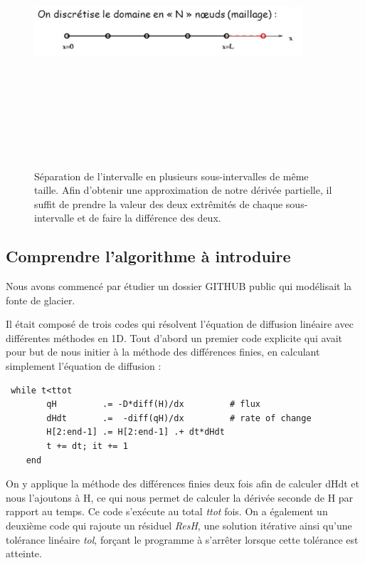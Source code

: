 \documentclass{article}
\begin{document}
\begin{figure}[!htpb]
\centering
\includegraphics[width=10cm, keepaspectratio=true, height=10cm]{Differences.png}
\caption{Séparation de l'intervalle en plusieurs sous-intervalles de même taille. Afin d'obtenir une approximation de notre dérivée partielle, il suffit de prendre la valeur des deux extrêmités de chaque sous-intervalle et de faire la différence des deux.}
\label{differences}
\end{figure}

\subsection{Comprendre l'algorithme à introduire}
Nous avons commencé par étudier un dossier GITHUB public \cite{site2} qui modélisait la fonte de glacier.
\newline

 Il était composé de trois codes qui résolvent l'équation de diffusion linéaire avec différentes méthodes en 1D. 
\newline
Tout d'abord un premier code explicite qui avait pour but de nous initier à la méthode des différences finies, en calculant simplement l'équation de diffusion : 

\begin{verbatim}
 while t<ttot
        qH         .= -D*diff(H)/dx         # flux
        dHdt       .=  -diff(qH)/dx         # rate of change
        H[2:end-1] .= H[2:end-1] .+ dt*dHdt
        t += dt; it += 1
    end
\end{verbatim}
 On y applique la méthode des différences finies deux fois afin de calculer dHdt et nous l’ajoutons à H, ce qui nous permet de calculer la dérivée seconde de H par rapport au temps. Ce code s'exécute au total \textit{ttot} fois.
\newpage
On a également un deuxième code qui rajoute un résiduel \textit{ResH}, une solution itérative ainsi qu'une tolérance linéaire \textit{tol}, forçant le programme à s'arrêter lorsque cette tolérance est atteinte.
\end{document}
